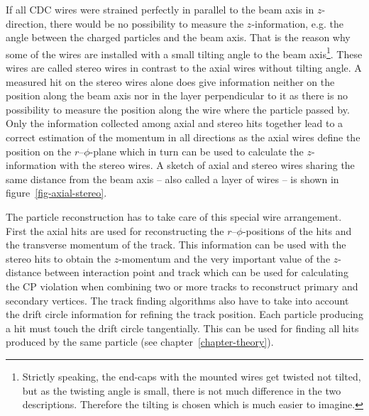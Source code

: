 If all CDC wires were strained perfectly in parallel to the beam axis in $z$-direction, there would be no possibility to measure the $z$-information, e.g. the angle between the charged particles and the beam axis. That is the reason why some of the wires are installed with a small tilting angle to the beam axis\footnote{Strictly speaking, the end-caps with the mounted wires get twisted not tilted, but as the twisting angle is small, there is not much difference in the two descriptions. Therefore the tilting is chosen which is much easier to imagine.}. These wires are called stereo wires in contrast to the axial wires without tilting angle. A measured hit on the stereo wires alone does give information neither on the position along the beam axis nor in the layer perpendicular to it as there is no possibility to measure the position along the wire where the particle passed by. Only the information collected among axial and stereo hits together lead to a correct estimation of the momentum in all directions as the axial wires define the position on the $r$--$\phi$-plane which in turn can be used to calculate the $z$-information with the stereo wires. A sketch of axial and stereo wires sharing the same distance from the beam axis -- also called a layer of wires -- is shown in figure~\ref{fig-axial-stereo}. 

The particle reconstruction has to take care of this special wire arrangement. First the axial hits are used for reconstructing the $r$--$\phi$-positions of the hits and the transverse momentum of the track. This information can be used with the stereo hits to obtain the $z$-momentum and the very important value of the $z$-distance between interaction point and track which can be used for calculating the CP violation when combining two or more tracks to reconstruct primary and secondary vertices. The track finding algorithms also have to take into account the drift circle information for refining the track position. Each particle producing a hit must touch the drift circle tangentially. This can be used for finding all hits produced by the same particle (see chapter~\ref{chapter-theory}).

